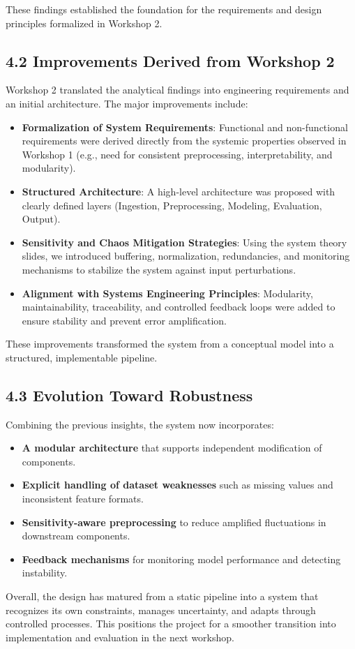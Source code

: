 \documentclass[12pt]{report}
\begin{document}
These findings established the foundation for the requirements and design principles formalized in Workshop 2.

\subsection*{4.2 Improvements Derived from Workshop 2}

Workshop 2 translated the analytical findings into engineering requirements and an initial architecture. The major improvements include:

\begin{itemize}
    \item \textbf{Formalization of System Requirements}: Functional and non-functional requirements were derived directly from the systemic properties observed in Workshop 1 (e.g., need for consistent preprocessing, interpretability, and modularity).
    \item \textbf{Structured Architecture}: A high-level architecture was proposed with clearly defined layers (Ingestion, Preprocessing, Modeling, Evaluation, Output).
    \item \textbf{Sensitivity and Chaos Mitigation Strategies}:  
        Using the system theory slides, we introduced buffering, normalization, redundancies, and monitoring mechanisms to stabilize the system against input perturbations.
    \item \textbf{Alignment with Systems Engineering Principles}:  
        Modularity, maintainability, traceability, and controlled feedback loops were added to ensure stability and prevent error amplification.
\end{itemize}

These improvements transformed the system from a conceptual model into a structured, implementable pipeline.

\subsection*{4.3 Evolution Toward Robustness}

Combining the previous insights, the system now incorporates:

\begin{itemize}
    \item \textbf{A modular architecture} that supports independent modification of components.
    \item \textbf{Explicit handling of dataset weaknesses} such as missing values and inconsistent feature formats.
    \item \textbf{Sensitivity-aware preprocessing} to reduce amplified fluctuations in downstream components.
    \item \textbf{Feedback mechanisms} for monitoring model performance and detecting instability.
\end{itemize}

Overall, the design has matured from a static pipeline into a system that recognizes its own constraints, manages uncertainty, and adapts through controlled processes. This positions the project for a smoother transition into implementation and evaluation in the next workshop.
\end{document}
